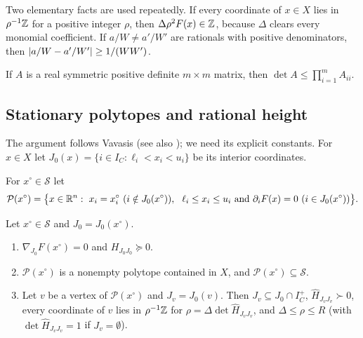Two elementary facts are used repeatedly. If every coordinate of $x\in X$
lies in $\rho^{-1}\mathbb Z$ for a positive integer $\rho$, then
$\Delta\rho^2F(x)\in\mathbb Z$, because $\Delta$ clears every monomial coefficient. If
$a/W\ne a'/W'$ are rationals with positive denominators, then
$\lvert a/W-a'/W'\rvert\ge1/(WW')$.

\begin{lemma}\label{lem:hadamard}
If $A$ is a real symmetric positive definite $m\times m$ matrix, then
$\det A\le\prod_{i=1}^mA_{ii}$.
\end{lemma}

\subsection{Stationary polytopes and rational height}\label{sec:exact-height}

The argument follows Vavasis \cite{Vavasis1990} (see also
\cite{DelPiaDeyMolinaro2017}); we need its explicit constants. For $x\in X$ let
$J_0(x)=\{i\in I_C:\ell_i<x_i<u_i\}$ be its interior coordinates.

\begin{definition}\label{def:statpoly}
For $x^\circ\in\mathcal S$ let
\[
\mathcal P(x^\circ)=\bigl\{x\in\R^n:\ x_i=x^\circ_i\ (i\notin J_0(x^\circ)),\ \
\ell_i\le x_i\le u_i\ \text{and}\ \partial_iF(x)=0\ (i\in J_0(x^\circ))\bigr\}.
\]
\end{definition}

\begin{lemma}[Stationary polytopes]\label{lem:statpoly}
Let $x^\circ\in\mathcal S$ and $J_0=J_0(x^\circ)$.
\begin{enumerate}[label=(\alph*)]
\item $\nabla_{J_0}F(x^\circ)=0$ and $H_{J_0J_0}\succeq0$.
\item $\mathcal P(x^\circ)$ is a nonempty polytope contained in $X$, and
$\mathcal P(x^\circ)\subseteq\mathcal S$.
\item Let $v$ be a vertex of $\mathcal P(x^\circ)$ and $J_v=J_0(v)$. Then
$J_v\subseteq J_0\cap I_C^+$, $\hat H_{J_vJ_v}\succ0$, every coordinate of $v$ lies
in $\rho^{-1}\mathbb Z$ for $\rho=\Delta\det\hat H_{J_vJ_v}$, and $\Delta\le\rho\le R$
(with $\det\hat H_{J_vJ_v}=1$ if $J_v=\emptyset$).
\end{enumerate}
\end{lemma}

